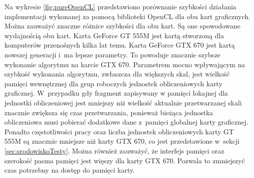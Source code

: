 Na wykresie \ref{fig:pureOpenCL} przedstawiono porównanie szybkości działania implementacji wykonanej za pomocą biblioteki OpenCL dla obu kart graficznych. Można zauważyć znaczne różnice szybkości dla obu kart. Są one spowodowane wydajnością obu kart. Karta GeForce GT 555M jest kartą stworzoną dla komputerów przenośnych kilka lat temu. Karta GeForce GTX 670 jest kartą nowszej generacji i~ma lepsze parametry. To powoduje znacznie szybsze wykonanie algorytmu na karcie GTX 670. Parametrem mocno wpływającym na szybkość wykonania algorytmu, zwłaszcza dla większych skal, jest wielkość pamięci wewnętrznej dla grup roboczych jednostek obliczeniowych karty graficznej. W~przypadku gdy fragment zapisywany w pamięci lokajnej dla jednostki obliczeniowej jest mniejszy niż wielkość aktualnie przetwarzanej skali znacznie zwiększa się czas przetwarzania, ponieważ bieżąca jednostka obliczeniowa musi pobierać dodatkowe dane z~pamięci globalnej karty graficznej. Ponadto częstotliwości pracy oraz liczba jednostek obliczeniowych karty GT 555M są znacznie mniejsze niż karty GTX 670, co jest przedstawione w~sekcji \ref{sec:srodowiskoTesty}. Można również zauważyć, że interfejs pamięci oraz szerokość pasma pamięci jest więszy dla karty GTX 670. Pozwala to zmniejszyć czas potrzebny na dostęp do pamięci karty.
